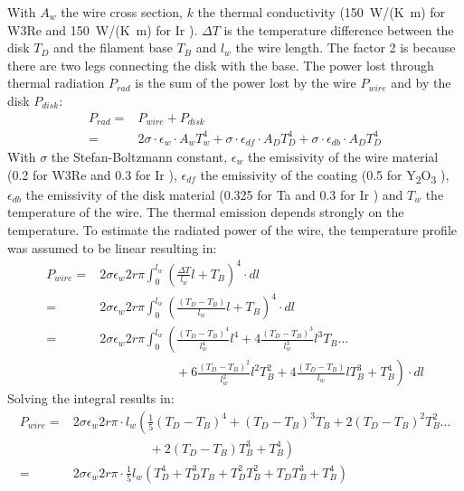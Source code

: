 		With $A_{w}$ the wire cross section, $k$ the thermal conductivity (150~W/(K~m) for W3Re \cite{thermcondTungst} and 150~W/(K~m) for Ir \cite{Ho_1972}). $\Delta T$ is the temperature difference between the disk $T_D$ and the filament base $T_B$ and $l_{w}$ the wire length. The factor 2 is because there are two legs connecting the disk with the base. %
		The power lost through thermal radiation $P_{rad}$ is the sum of the power lost by the wire $P_{wire}$ and by the disk $P_{disk}$:
		\begin{align}
			P_{rad} =& P_{wire} + P_{disk}\\
					=& 2\sigma\cdot\epsilon_{w}\cdot A_w T_w^4 + \sigma\cdot\epsilon_{df}\cdot A_D T_D^4 + \sigma\cdot\epsilon_{db}\cdot A_D T_D^4
		\end{align}
		With $\sigma$ the Stefan-Boltzmann constant, $\epsilon_{w}$ the emissivity of the wire material (0.2 for W3Re \cite{thermcondTungst} and 0.3 for Ir \cite{Burgess1914}), $\epsilon_{df}$ the emissivity of the coating (0.5 for Y\textsubscript{2}O\textsubscript{3} \cite{ThermEmiss_Y2O3}), $\epsilon_{db}$ the emissivity of the disk material (0.325 for Ta \cite{ThermalEmiss_Ta} and 0.3 for Ir \cite{Burgess1914}) and $T_w$ the temperature of the wire. The thermal emission depends strongly on the temperature. To estimate the radiated power of the wire, the temperature profile was assumed to be linear resulting in:
		\begin{align}
			P_{wire} =& 2\sigma\epsilon_{w}2r\pi\int_{0}^{l_w} \left(\frac{\Delta T}{l_w}l + T_{B}\right)^4\cdot dl\\
					=& 2\sigma\epsilon_{w}2r\pi\int_{0}^{l_w} \left(\frac{(T_D-T_B)}{l_w}l + T_{B}\right)^4\cdot dl\\
					=& 2\sigma\epsilon_{w}2r\pi\int_{0}^{l_w} \left(  \frac{(T_D-T_B)^4}{l_w^4}l^4 + 4\frac{(T_D-T_B)^3}{l_w^3}l^3T_B \ldots \right. \nonumber \\
					& \left. \qquad\qquad\qquad + 6\frac{(T_D-T_B)^2}{l_w^2}l^2T_B^2 + 4\frac{(T_D-T_B)}{l_w}lT_B^3 + T_B^4  \right) \cdot dl
		\end{align}
		Solving the integral results in:
		\begin{align}
			P_{wire} =& 2\sigma\epsilon_{w}2r\pi\cdot l_w \left( \frac{1}{5}(T_D-T_B)^4 + (T_D-T_B)^3T_B + 2(T_D-T_B)^2T_B^2 \ldots\right.\nonumber\\
					 & \left. \qquad\qquad\qquad + 2(T_D-T_B)T_B^3 + T_B^4 \right)\\
					=& 2\sigma\epsilon_{w}2r\pi\cdot \frac{1}{5}l_w \left(T_D^4 + T_D^3 T_B + T_D^2 T_B^2 + T_D T_B^3 + T_B^4 \right)
		\end{align}
